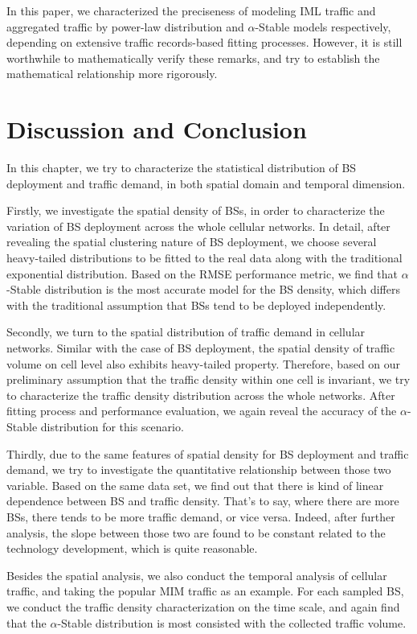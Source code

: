 In this paper, we characterized the preciseness of modeling IML traffic and aggregated traffic by power-law distribution and $\alpha$-Stable models respectively, depending on extensive traffic records-based fitting processes. However, it is still worthwhile to mathematically verify these remarks, and try to establish the mathematical relationship more rigorously.
\section{Discussion and Conclusion} \label{sec4-concl}
In this chapter, we try to characterize the statistical distribution of BS deployment and traffic demand, in both spatial domain and temporal dimension.

Firstly, we investigate the spatial density of BSs, in order to characterize the variation of BS deployment across the whole cellular networks. In detail, after revealing the spatial clustering nature of BS deployment, we choose several heavy-tailed distributions to be fitted to the real data along with the traditional exponential distribution. Based on the RMSE performance metric, we find that $\alpha$-Stable distribution is the most accurate model for the BS density, which differs with the traditional assumption that BSs tend to be deployed independently.

Secondly, we turn to the spatial distribution of traffic demand in cellular networks. Similar with the case of BS deployment, the spatial density of traffic volume on cell level also exhibits heavy-tailed property. Therefore, based on our preliminary assumption that the traffic density within one cell is invariant, we try to characterize the traffic density distribution across the whole networks. After fitting process and performance evaluation, we again reveal the accuracy of the $\alpha$-Stable distribution for this scenario.

Thirdly, due to the same features of spatial density for BS deployment and traffic demand, we try to investigate the quantitative relationship between those two variable. Based on the same data set, we find out that there is kind of linear dependence between BS and traffic density. That's to say, where there are more BSs, there tends to be more traffic demand, or vice versa. Indeed, after further analysis, the slope between those two are found to be constant related to the technology development, which is quite reasonable.

Besides the spatial analysis, we also conduct the temporal analysis of cellular traffic, and taking the popular MIM traffic as an example. For each sampled BS, we conduct the traffic density characterization on the time scale, and again find that the $\alpha$-Stable distribution is most consisted with the collected traffic volume.
